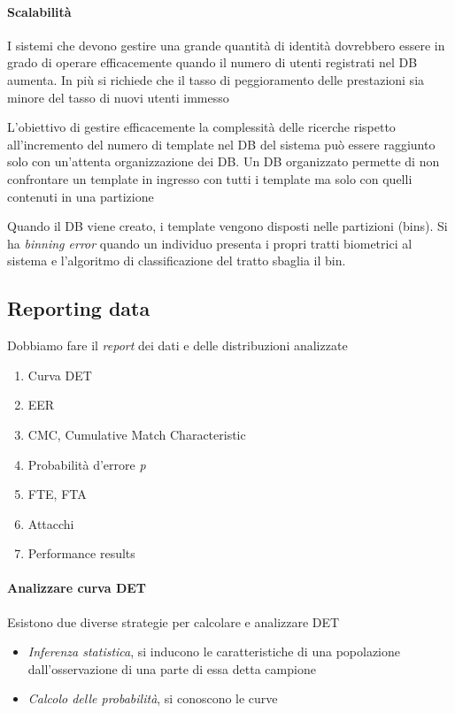 \paragraph{Scalabilità}
I sistemi che devono gestire una grande quantità di identità dovrebbero essere in grado di operare efficacemente quando il numero di utenti registrati nel DB aumenta. In più si richiede che il tasso di peggioramento delle prestazioni sia minore del tasso di nuovi utenti immesso

L’obiettivo di gestire efficacemente la complessità delle ricerche rispetto all’incremento del numero di template nel DB del sistema può essere raggiunto solo con un'attenta organizzazione dei DB. Un DB organizzato permette di non confrontare un template in ingresso con tutti i template ma solo con quelli contenuti in una partizione

Quando il DB viene creato, i template vengono disposti nelle partizioni (bins). Si ha \textit{binning error} quando un individuo presenta i propri tratti biometrici al sistema e l’algoritmo di classificazione del tratto sbaglia il bin.

\subsection{Reporting data}
Dobbiamo fare il \textit{report} dei dati e delle distribuzioni analizzate
\begin{enumerate}
    \item Curva DET
    \item EER
    \item CMC, Cumulative Match Characteristic
    \item Probabilità d'errore \textit{p}
    \item FTE, FTA
    \item Attacchi
    \item Performance results
\end{enumerate}

\paragraph{Analizzare curva DET}
Esistono due diverse strategie per calcolare e analizzare DET
\begin{itemize}
    \item \textit{Inferenza statistica}, si inducono le caratteristiche di una popolazione dall’osservazione di una parte di essa detta campione
    \item \textit{Calcolo delle probabilità}, si conoscono le curve
\end{itemize}

